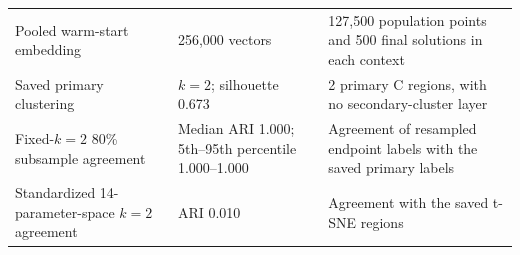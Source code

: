 \begin{table}[!htbp]
\begin{tabular}{@{}p{}p{}p{}@{}}
Pooled warm-start embedding & 256,000 vectors & 127,500 population points and 500 final solutions in each context \\
Saved primary clustering & $k=2$; silhouette 0.673 & 2 primary C regions, with no secondary-cluster layer \\
Fixed-$k=2$ 80\% subsample agreement & Median ARI 1.000; 5th--95th percentile 1.000--1.000 & Agreement of resampled endpoint labels with the saved primary labels \\
Standardized 14-parameter-space $k=2$ agreement & ARI 0.010 & Agreement with the saved t-SNE regions \\
\bottomrule
\end{tabular}
\end{table}
